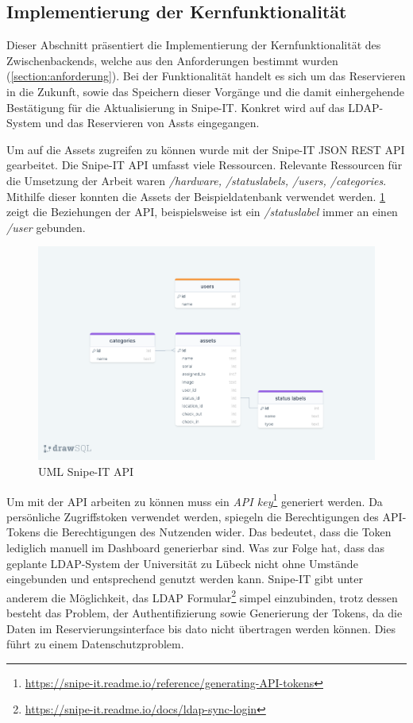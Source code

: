 \subsection{Implementierung der Kernfunktionalität} 
Dieser Abschnitt präsentiert die Implementierung der Kernfunktionalität des Zwischenbackends, welche
aus den Anforderungen bestimmt wurden (\ref{section:anforderung}). Bei der Funktionalität handelt es
sich um das Reservieren in die Zukunft, sowie das Speichern dieser Vorgänge und die damit
einhergehende Bestätigung für die Aktualisierung in Snipe-IT. Konkret wird auf das LDAP-System und
das Reservieren von Assts eingegangen. 

Um auf die Assets zugreifen zu können wurde mit der Snipe-IT JSON REST API gearbeitet. Die Snipe-IT
API umfasst viele Ressourcen. Relevante Ressourcen für die Umsetzung der Arbeit waren \textit{/hardware,
/statuslabels, /users, /categories}. Mithilfe dieser konnten die Assets der Beispieldatenbank
verwendet werden. \ref{fig:snipe} zeigt die Beziehungen der API, beispielsweise ist ein
\textit{/statuslabel} immer an einen \textit{/user} gebunden. 

\begin{figure}[h]
  \centering
  \includegraphics[scale=0.2]{Bilder/drawSQL-export-2022-10-12_17 27.png}
  \caption[UML Snipe-IT API]{UML Snipe-IT API}
  \label{fig:snipe}
\end{figure}

Um mit der API arbeiten zu können muss ein \textit{API
  key}\footnote{\url{https://snipe-it.readme.io/reference/generating-API-tokens}}
  generiert werden. Da persönliche Zugriffstoken verwendet werden, spiegeln die
  Berechtigungen des API-Tokens die Berechtigungen des Nutzenden wider. Das
  bedeutet, dass die Token lediglich manuell im Dashboard generierbar sind.
  Was zur Folge hat, dass das geplante LDAP-System der Universität zu Lübeck
  nicht ohne Umstände eingebunden und entsprechend genutzt werden kann. Snipe-IT
  gibt unter anderem die Möglichkeit, das LDAP
  Formular\footnote{\url{https://snipe-it.readme.io/docs/ldap-sync-login}}
  simpel einzubinden, trotz dessen besteht das Problem, der Authentifizierung
  sowie Generierung der Tokens, da die Daten im Reservierungsinterface bis
  dato nicht übertragen werden können. Dies führt zu einem Datenschutzproblem.

